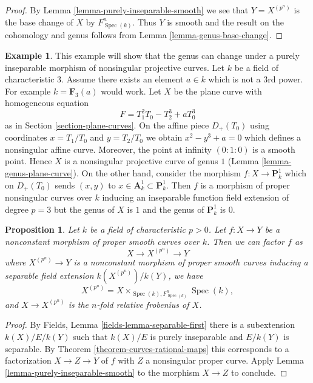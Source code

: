 \documentclass{stacks-project}
\theoremstyle{plain}
\newtheorem{proposition}[subsection]{Proposition}
\theoremstyle{definition}
\newtheorem{example}[subsection]{Example}
\theoremstyle{remark}
\numberwithin{equation}{subsection}
\def\Spec{\mathop{\mathrm{Spec}}}
\begin{document}
\begin{proof}
By Lemma \ref{lemma-purely-inseparable-smooth}
we see that $Y = X^{(p^n)}$ is the base change of
$X$ by $F_{\Spec(k)}^n$. Thus $Y$ is smooth and the result on the
cohomology and genus follows from
Lemma \ref{lemma-genus-base-change}.
\end{proof}

\begin{example}
\label{example-inseparable}
This example will show that the genus can change under a
purely inseparable morphism of nonsingular projective curves.
Let $k$ be a field of characteristic $3$. Assume there exists
an element $a \in k$ which is not a $3$rd power. For example
$k = \mathbf{F}_3(a)$ would work. Let $X$ be the plane curve
with homogeneous equation
$$
F = T_1^2T_0 - T_2^3 + aT_0^3
$$
as in Section \ref{section-plane-curves}.
On the affine piece $D_+(T_0)$ using coordinates $x = T_1/T_0$
and $y = T_2/T_0$ we obtain $x^2 - y^3 + a = 0$ which defines
a nonsingular affine curve. Moreover, the point at infinity
$(0 : 1: 0)$ is a smooth point. Hence $X$ is a nonsingular projective
curve of genus $1$ (Lemma \ref{lemma-genus-plane-curve}).
On the other hand, consider the morphism
$f : X \to \mathbf{P}^1_k$ which on $D_+(T_0)$ sends $(x, y)$ to
$x \in \mathbf{A}^1_k \subset \mathbf{P}^1_k$.
Then $f$ is a morphism of proper nonsingular curves over $k$
inducing an inseparable function field extension of degree $p = 3$
but the genus of $X$ is $1$ and the genus of $\mathbf{P}^1_k$ is $0$.
\end{example}

\begin{proposition}
\label{proposition-unwind-morphism-smooth}
Let $k$ be a field of characteristic $p > 0$. Let $f : X \to Y$ be a
nonconstant morphism of proper smooth curves over $k$.
Then we can factor $f$ as
$$
X \longrightarrow X^{(p^n)} \longrightarrow Y
$$
where $X^{(p^n)} \to Y$ is a nonconstant morphism of proper smooth curves
inducing a separable field extension $k(X^{(p^n)})/k(Y)$, we have
$$
X^{(p^n)} = X \times_{\Spec(k), F_{\Spec(k)}^n} \Spec(k),
$$
and $X \to X^{(p^n)}$ is the $n$-fold relative frobenius of $X$.
\end{proposition}

\begin{proof}
By Fields, Lemma \ref{fields-lemma-separable-first}
there is a subextension $k(X)/E/k(Y)$ such that
$k(X)/E$ is purely inseparable and $E/k(Y)$ is separable.
By Theorem \ref{theorem-curves-rational-maps}
this corresponds to a factorization
$X \to Z \to Y$ of $f$ with $Z$ a nonsingular proper curve.
Apply Lemma \ref{lemma-purely-inseparable-smooth}
to the morphism $X \to Z$ to conclude.
\end{proof}
\end{document}
